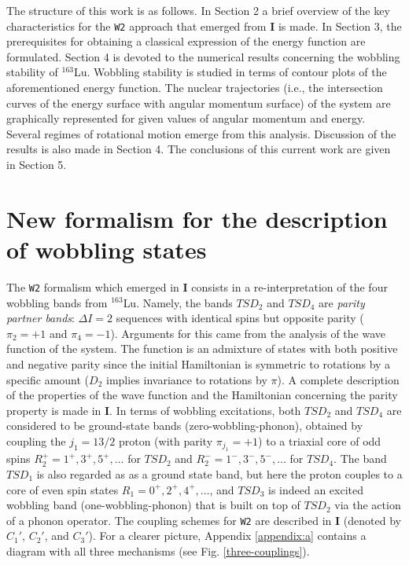 \documentclass[myclassdoc,debug]{rjparticle}
\begin{document}
The structure of this work is as follows. In Section 2 a brief overview of the key characteristics for the \texttt{W2} approach that emerged from \textbf{I} is made. In Section 3, the prerequisites for obtaining a classical expression of the energy function are formulated. Section 4 is devoted to the numerical results concerning the wobbling stability of $^{163}$Lu. Wobbling stability is studied in terms of contour plots of the aforementioned energy function. The nuclear trajectories (i.e., the intersection curves of the energy surface with angular momentum surface) of the system are graphically represented for given values of angular momentum and energy. Several regimes of rotational motion emerge from this analysis. Discussion of the results is also made in Section 4. The conclusions of this current work are given in Section 5.

\section{New formalism for the description of wobbling states}

The \texttt{W2} formalism which emerged in \textbf{I} \cite{poenaru2021parity} consists in a re-interpretation of the four wobbling bands from $^{163}$Lu. Namely, the bands $TSD_2$ and $TSD_4$ are \emph{parity partner bands}: $\Delta I=2$ sequences with identical spins but opposite parity ($\pi_{2}=+1$ and $\pi_{4}=-1$). Arguments for this came from the analysis of the wave function of the system. The function is an admixture of states with both positive and negative parity since the initial Hamiltonian is symmetric to rotations by a specific amount ($D_2$ implies invariance to rotations by $\pi$). A complete description of the properties of the wave function and the Hamiltonian concerning the parity property is made in \textbf{I}. In terms of wobbling excitations, both $TSD_2$ and $TSD_4$ are considered to be ground-state bands (zero-wobbling-phonon), obtained by coupling the $j_1=13/2$ proton (with parity $\pi_{j_1}=+1$) to a triaxial core of odd spins $R_2^+=1^+,3^+,5^+,\dots$ for $TSD_2$ and $R_2^-=1^-,3^-,5^-,\dots$ for $TSD_4$. The band $TSD_1$ is also regarded as as a ground state band, but here the proton couples to a core of even spin states $R_1=0^+,2^+,4^+,\dots$, and $TSD_3$ is indeed an excited wobbling band (one-wobbling-phonon) that is built on top of $TSD_2$ via the action of a phonon operator. The coupling schemes for \texttt{W2} are described in \textbf{I} (denoted by $C_1'$, $C_2'$, and $C_3'$). For a clearer picture, Appendix \ref{appendix:a} contains a diagram with all three mechanisms (see Fig. \ref{three-couplings}).
\end{document}
